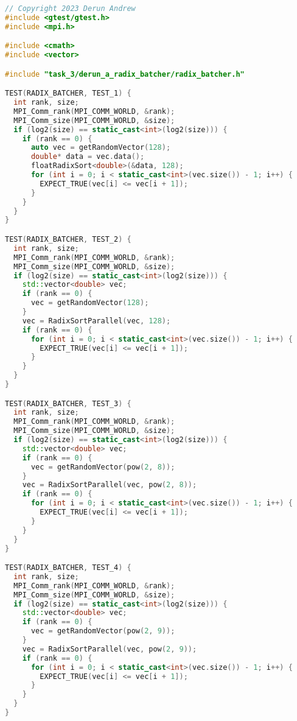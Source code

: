 \documentclass{report}
\begin{document}
\begin{lstlisting}[language=C++]
// Copyright 2023 Derun Andrew
#include <gtest/gtest.h>
#include <mpi.h>

#include <cmath>
#include <vector>

#include "task_3/derun_a_radix_batcher/radix_batcher.h"

TEST(RADIX_BATCHER, TEST_1) {
  int rank, size;
  MPI_Comm_rank(MPI_COMM_WORLD, &rank);
  MPI_Comm_size(MPI_COMM_WORLD, &size);
  if (log2(size) == static_cast<int>(log2(size))) {
    if (rank == 0) {
      auto vec = getRandomVector(128);
      double* data = vec.data();
      floatRadixSort<double>(&data, 128);
      for (int i = 0; i < static_cast<int>(vec.size()) - 1; i++) {
        EXPECT_TRUE(vec[i] <= vec[i + 1]);
      }
    }
  }
}

TEST(RADIX_BATCHER, TEST_2) {
  int rank, size;
  MPI_Comm_rank(MPI_COMM_WORLD, &rank);
  MPI_Comm_size(MPI_COMM_WORLD, &size);
  if (log2(size) == static_cast<int>(log2(size))) {
    std::vector<double> vec;
    if (rank == 0) {
      vec = getRandomVector(128);
    }
    vec = RadixSortParallel(vec, 128);
    if (rank == 0) {
      for (int i = 0; i < static_cast<int>(vec.size()) - 1; i++) {
        EXPECT_TRUE(vec[i] <= vec[i + 1]);
      }
    }
  }
}

TEST(RADIX_BATCHER, TEST_3) {
  int rank, size;
  MPI_Comm_rank(MPI_COMM_WORLD, &rank);
  MPI_Comm_size(MPI_COMM_WORLD, &size);
  if (log2(size) == static_cast<int>(log2(size))) {
    std::vector<double> vec;
    if (rank == 0) {
      vec = getRandomVector(pow(2, 8));
    }
    vec = RadixSortParallel(vec, pow(2, 8));
    if (rank == 0) {
      for (int i = 0; i < static_cast<int>(vec.size()) - 1; i++) {
        EXPECT_TRUE(vec[i] <= vec[i + 1]);
      }
    }
  }
}

TEST(RADIX_BATCHER, TEST_4) {
  int rank, size;
  MPI_Comm_rank(MPI_COMM_WORLD, &rank);
  MPI_Comm_size(MPI_COMM_WORLD, &size);
  if (log2(size) == static_cast<int>(log2(size))) {
    std::vector<double> vec;
    if (rank == 0) {
      vec = getRandomVector(pow(2, 9));
    }
    vec = RadixSortParallel(vec, pow(2, 9));
    if (rank == 0) {
      for (int i = 0; i < static_cast<int>(vec.size()) - 1; i++) {
        EXPECT_TRUE(vec[i] <= vec[i + 1]);
      }
    }
  }
}


\end{lstlisting}
\end{document}
